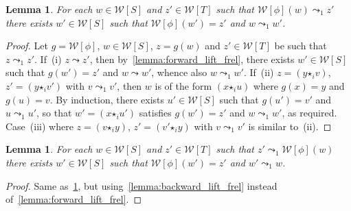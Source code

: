\documentclass[reqno]{amsart}
\theoremstyle{plain}
\newtheorem{lemma}[subsubsection]{Lemma}
\theoremstyle{definition}
\theoremstyle{remark}
\newcommand{\WW}{\mathcal{W}}
\newcommand{\wtx}[1]{\WW[#1]} %
\newcommand{\fcomp}[1]{\bm{\star}_{#1}} %
\newcommand{\frel}{\leadsto} %
\newcommand{\cfrel}{\leadsto_1} %
\begin{document}
\begin{lemma}\label{lemma:forward_lift_cfrel}
 For each $w\in \wtx S$ and $z'\in\wtx
 T$ such that $\wtx{\phi}(w)\cfrel z'$ there exists $w'\in\wtx S$ such
 that $\wtx\phi(w')=z'$ and $w\cfrel w'$.
\end{lemma}
\begin{proof}
 Let $g=\wtx\phi$, $w\in\wtx S$, $z=g(w)$ and $z'\in\wtx T$ be such that
   $z\cfrel z'$. If~(i) $z\frel z'$, then
   by~\cref{lemma:forward_lift_frel}, there exists $w'\in\wtx S$ such
   that $g(w')=z'$ and $w\frel w'$, whence also $w\cfrel w'$. If~(ii)
   $z=(y\fcomp i v)$, $z'=(y\fcomp i v')$ with $v\cfrel v'$, then $w$
   is of the form $(x\fcomp i u)$ where $g(x)=y$ and $g(u)=v$. By
   induction, there exists $u'\in\wtx S$ such that $g(u')=v'$ and
   $u\cfrel u'$, so that $w'=(x\fcomp i u')$ satisfies $g(w')=z'$ and
   $w\cfrel w'$, as required. Case~(iii) where $z=(v\fcomp i y)$,
   $z'=(v'\fcomp i y)$ with $v\cfrel v'$ is similar to~(ii).
\end{proof}
\begin{lemma}\label{lemma:backward_lift_cfrel}
 For each $w\in \wtx S$ and $z'\in\wtx
 T$ such that $z'\cfrel\wtx{\phi}(w)$ there exists $w'\in\wtx S$ such
 that $\wtx\phi(w')=z'$ and $w'\cfrel w$.
\end{lemma}
\begin{proof}
  Same as~\cref{lemma:forward_lift_cfrel}, but using~\cref{lemma:backward_lift_frel} instead of~\cref{lemma:forward_lift_frel}.
\end{proof}
 
\end{document}
